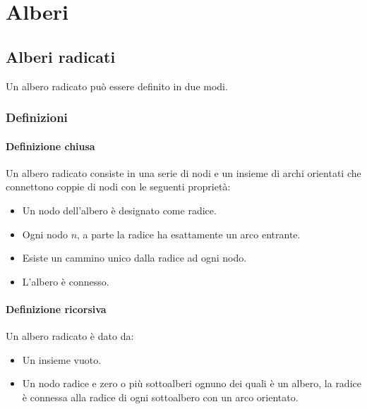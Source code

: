 \chapter{Alberi}
\section{Alberi radicati}
Un albero radicato pu\`o essere definito in due modi.
\subsection{Definizioni}
\subsubsection{Definizione chiusa}
Un albero radicato consiste in una serie di nodi e un insieme di archi orientati che connettono coppie di nodi con le seguenti propriet\`a:
\begin{itemize}
\item Un nodo dell'albero \`e designato come radice.
\item Ogni nodo $n$, a parte la radice ha esattamente un arco entrante.
\item Esiste un cammino unico dalla radice ad ogni nodo.
\item L'albero \`e connesso.
\end{itemize}
\subsubsection{Definizione ricorsiva}
Un albero radicato \`e dato da:
\begin{itemize}
\item Un insieme vuoto.
\item Un nodo radice e zero o pi\`u sottoalberi ognuno dei quali \`e un albero, la radice \`e connessa alla radice di ogni sottoalbero con un arco orientato.
\end{itemize}

